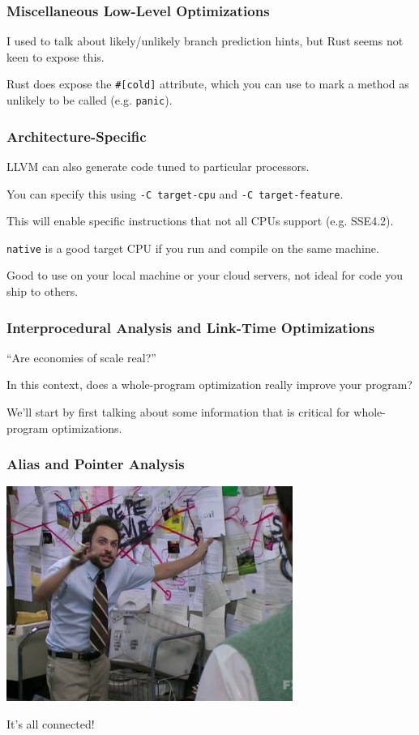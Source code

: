 \begin{frame}[fragile]
\frametitle{Miscellaneous Low-Level Optimizations}

I used to talk about likely/unlikely branch prediction hints,
but Rust seems not keen to expose this. 

Rust does expose the \verb+#[cold]+
attribute, which you can use to mark a method as unlikely to be called (e.g. \texttt{panic}).


\end{frame}


\begin{frame}
\frametitle{Architecture-Specific}

LLVM can also generate code tuned to particular
processors. 

 You can specify this using {\tt  -C target-cpu} and {\tt -C target-feature}.

This will enable specific instructions that not all CPUs support (e.g. SSE4.2).

{\tt native} is a good target CPU if you run and compile on the same machine.

\noindent
Good to use on your local machine or your cloud servers, not ideal for code you ship to others.


\end{frame}



\begin{frame}
\frametitle{Interprocedural Analysis and Link-Time Optimizations}

``Are economies of scale real?''

In this context, does a
whole-program optimization really improve your program?


We'll start by first talking about some information that is critical for
whole-program optimizations.

\end{frame}


\begin{frame}
\frametitle{Alias and Pointer Analysis}

\begin{center}
	\includegraphics[width=0.7\textwidth]{images/redstring.jpg}
\end{center}

It's all connected!

\end{frame}


